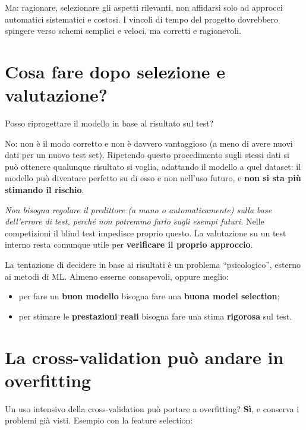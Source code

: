 Ma: ragionare, selezionare gli aspetti rilevanti, non affidarsi solo ad
approcci automatici sistematici e costosi. I vincoli di tempo del
progetto dovrebbero spingere verso schemi semplici e veloci, ma corretti
e ragionevoli.

\section{Cosa fare dopo selezione e
valutazione?}\label{cosa-fare-dopo-selezione-e-valutazione}

\begin{boxquestion}{Posso riprogettare il modello in base al risultato sul test?}

No: non è il modo corretto e non è davvero vantaggioso (a meno di avere
nuovi dati per un nuovo test set). Ripetendo questo procedimento sugli
stessi dati si può ottenere qualunque risultato si voglia, adattando il
modello a quel dataset: il modello può diventare perfetto su di esso e
non nell'uso futuro, e \textbf{non si sta più stimando il rischio}.

\emph{Non bisogna regolare il predittore (a mano o automaticamente)
sulla base dell'errore di test, perché non potremmo farlo sugli esempi
futuri.} Nelle competizioni il blind test impedisce proprio questo. La
valutazione su un test interno resta comunque utile per
\textbf{verificare il proprio approccio}.

\end{boxquestion}

La tentazione di decidere in base ai risultati è un problema
``psicologico'', esterno ai metodi di ML. Almeno esserne consapevoli,
oppure meglio:

\begin{itemize}
\tightlist
\item
  per fare un \textbf{buon modello} bisogna fare una \textbf{buona model
  selection};
\item
  per stimare le \textbf{prestazioni reali} bisogna fare una stima
  \textbf{rigorosa} sul test.
\end{itemize}

\section{La cross-validation può andare in
overfitting}\label{la-cross-validation-puuxf2-andare-in-overfitting}

Un uso intensivo della cross-validation può portare a overfitting?
\textbf{Sì}, e conserva i problemi già visti. Esempio con la feature
selection:


